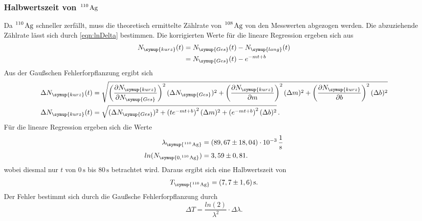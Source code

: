 \subsubsection{Halbwertszeit von $\ce{^110 Ag}$}
\label{sec:110Ag}
Da $\ce{^110 Ag}$ schneller zerfällt, muss die theoretisch ermittelte Zählrate von $\ce{^108 Ag}$ von den Messwerten
abgezogen werden. Die abzuziehende Zählrate lässt sich durch \autoref{eqn:lnDelta} bestimmen. Die korrigierten Werte
für die lineare Regression ergeben sich aus
\begin{align*}
  N_{\symup{kurz}}(t) &= N_{\symup{Ges}}(t) - N_{\symup{lang}}(t) \\
                      &= N_{\symup{Ges}}(t) - e^{-mt + b}
\end{align*}
Aus der Gaußschen Fehlerforpflanzung ergibt sich
\begin{align*}
  \Delta N_{\symup{kurz}}(t) &= \sqrt{
    \left(\frac{\partial N_{\symup{kurz}}}{\partial N_{\symup{Ges}}}\right)^2 (\Delta N_{\symup{Ges}})^2 +
    \left(\frac{\partial N_{\symup{kurz}}}{\partial m}\right)^2 (\Delta m)^2 + 
    \left(\frac{\partial N_{\symup{kurz}}}{\partial b}\right)^2 (\Delta b)^2} \\
  \Delta N_{\symup{kurz}}(t) &= \sqrt{
    (\Delta N_{\symup{Ges}})^2 +
    \left(te^{-mt+b}\right)^2 (\Delta m)^2 +
    \left(e^{-mt+b}\right)^2 (\Delta b)^2
  }\,. \\
\end{align*}
Für die lineare Regression ergeben sich die Werte
\begin{align*}
  \lambda_{\symup{\ce{^110 Ag}}}  &= (89,67 \pm 18,04)\cdot 10^{-3}\,\frac{1}{\unit{\second}} \\
  ln(N_{\symup{0, \ce{^110 Ag}}}) &= 3,59 \pm 0,81. \\
\end{align*}
wobei diesmal nur $t$ von $0\,\unit{\second}$ bis $80\,\unit{\second}$ betrachtet wird.
Daraus ergibt sich eine Halbwertszeit von
\begin{align*}
  T_{\symup{\ce{^110 Ag}}} = (7,7 \pm 1,6)\,\unit{\second}.
\end{align*}
Der Fehler bestimmt sich durch die Gaußsche Fehlerforpflanzung durch
\begin{equation*}
  \Delta T = \frac{ln(2)}{\lambda^2} \cdot \Delta \lambda. 
\end{equation*}